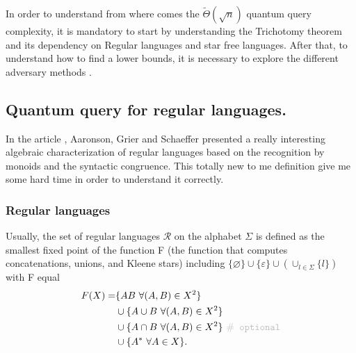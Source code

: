 In order to understand from where comes the $\tilde{\Theta}(\sqrt{n})$ quantum
query complexity, it is mandatory to start by understanding the
Trichotomy theorem \cite{trichotomy_not_andris} and its dependency on Regular
languages and star free languages.
After that, to understand how to find a lower bounds, it is necessary to explore
the different adversary methods \cite{adversary_equivalence}.

\subsection{Quantum query for regular languages.}

In the article \cite{trichotomy_not_andris}, Aaronson, Grier and Schaeffer presented
a really interesting algebraic characterization of regular languages based on the
recognition by monoids and the syntactic congruence. This totally new to me definition
give me some hard time in order to understand it correctly.

\subsubsection{Regular languages}

Usually, the set of regular languages $\mathcal{R}$ on the alphabet $\Sigma$ is defined as the smallest
fixed point of the function F (the function that computes concatenations, unions, and Kleene stars)
including $\{\varnothing\} \cup \{\varepsilon\} \cup(\cup_{l\in\Sigma}\{l\})$
with F equal
\begin{align*}\label{eq:F}
    F(X) = & \{AB\  \forall (A,B)\in X^2\}                                                   \\
           & \cup \{A\cup B\ \forall (A,B) \in X^2 \}                                        \\
           & \cup \{A\cap B\ \forall (A,B) \in X^2 \}\ \texttt{\color{gray!50}$\#$ optional} \\
           & \cup \{A^*\ \forall A \in X \}.
\end{align*}

